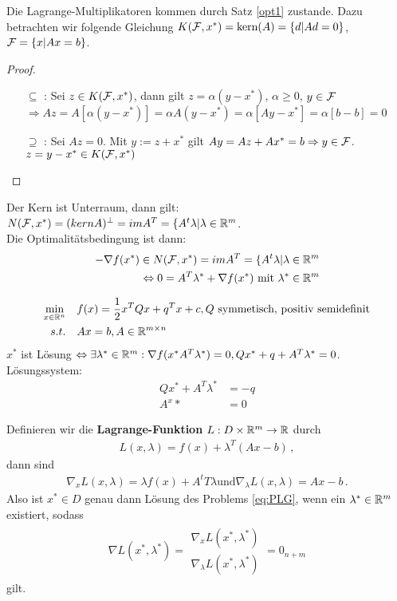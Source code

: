 \begin{Lemma}
Die Lagrange-Multiplikatoren kommen durch Satz \ref{opt1} zustande. Dazu betrachten wir folgende Gleichung $K(\mathcal{F},x^*)=\text{kern}(A)=\lbrace d|Ad=0\rbrace$, $\mathcal{F}=\lbrace x|Ax=b\rbrace$.
\end{Lemma}
\begin{proof}
\begin{itemize}
\item[$\subseteq$ :]Sei $z\in K(\mathcal{F},x^*)$, dann gilt $z=\alpha(y-x^*)$, $\alpha\geq 0$, $y\in\mathcal{F}$
$\Rightarrow Az=A[\alpha(y-x^*)]=\alpha A(y-x^*)=\alpha[Ay-x^*]=\alpha[b-b]=0$
\item[$\supseteq$ :] Sei $Az=0$. Mit $y:=z+x^*$ gilt $Ay=Az+Ax^*=b \Rightarrow y\in\mathcal{F}$.
$z=y-x^*\in K(\mathcal{F},x^*)$
\end{itemize}
\end{proof}
Der Kern ist Unterraum, dann gilt: $N(\mathcal{F},x^*)=(kern A)^\perp=im A^T=\lbrace A^t\lambda|\lambda\in\mathbb R^m$.\\
Die Optimalitätsbedingung ist dann:
\begin{align*}
-\nabla f(x^*)\in N(\mathcal{F},x^*)=im A^T=\lbrace A^t\lambda|\lambda\in\mathbb R^m \\
\Leftrightarrow 0=A^T \lambda^*+\nabla f(x^*) \text{ mit } \lambda^*\in\mathbb R^m
\end{align*}

\begin{Beispiel} 
  	\begin{align}
   		\min_{x\in\mathbb R^n}
   		& & & f(x)=\frac{1}{2}x^TQx+q^Tx+c, Q\text{ symmetisch, positiv semidefinit} \\
   		s.t. &&& Ax=b, A\in\mathbb R^{m\times n}
  	\end{align}
$x^*$ ist Lösung $\Leftrightarrow \exists \lambda^*\in\mathbb R^m: \nabla f(x^*A^T\lambda^*)=0, Qx^*+q+A^T\lambda^*=0$.
Lösungssystem:
\begin{align*}
Qx^*+A^T\lambda^*&=-q \\
A^x*&=0
\end{align*}

\end{Beispiel} 

Definieren wir die \textbf{Lagrange-Funktion} $L: D \times \mathbb R^m \rightarrow \mathbb R$ durch
\begin{align*}
L(x, \lambda) = f(x) + \lambda^T (Ax - b) \,,
\end{align*}
dann sind
\begin{align*}
\nabla_x L(x, \lambda) = \lambda f(x) + A^tT \lambda \text{und} \nabla_\lambda L(x, \lambda) = Ax - b\,.
\end{align*}
Also ist $x^* \in D$ genau dann Lösung des Problems \eqref{eq:PLG}, wenn ein $\lambda^* \in \mathbb R^m$ existiert, sodass
\begin{align*}
\nabla L(x^* , \lambda ^*) = \begin{matrix}
\nabla_x L(x^*, \lambda ^* )\\
\nabla_\lambda L(x^*, \lambda^* )
\end{matrix}
= 0_{n+m}
\end{align*}
gilt.


